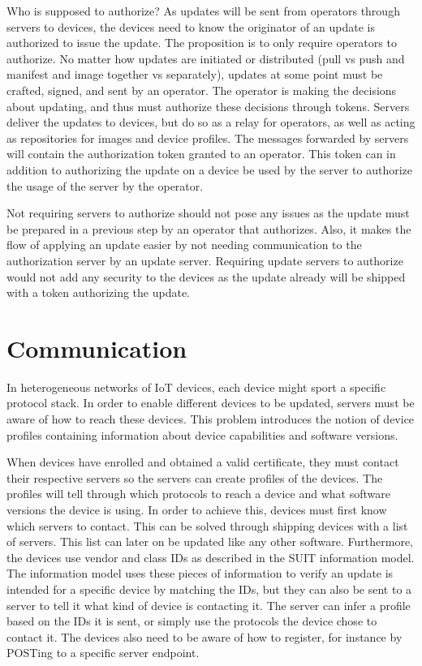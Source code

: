 \documentclass[0-thesis.tex]{subfiles}
\begin{document}
Who is supposed to authorize? As updates will be sent from operators through servers to
devices, the devices need to know the originator of an update is authorized to issue the
update. The proposition is to only require operators to authorize. No matter how updates
are initiated or distributed (pull vs push and manifest and image together vs separately),
updates at some point must be crafted, signed, and sent by an operator. The operator is
making the decisions about updating, and thus must authorize these decisions through
tokens. Servers deliver the updates to devices, but do so as a relay for operators, as
well as acting as repositories for images and device profiles. The messages forwarded by
servers will contain the authorization token granted to an operator. This token can in
addition to authorizing the update on a device be used by the server to authorize the
usage of the server by the operator. 

Not requiring servers to authorize should not pose any issues as the update must be
prepared in a previous step by an operator that authorizes. Also, it makes the flow of
applying an update easier by not needing communication to the authorization server by an
update server. Requiring update servers to authorize would not add any security to the
devices as the update already will be shipped with a token authorizing the update.

\section{Communication}
\label{sec:communication}
In heterogeneous networks of IoT devices, each device might sport a specific protocol
stack. In order to enable different devices to be updated, servers must be aware of how to
reach these devices. This problem introduces the notion of device profiles containing
information about device capabilities and software versions. 

When devices have enrolled and obtained a valid certificate, they must contact their
respective servers so the servers can create profiles of the devices. The profiles will
tell through which protocols to reach a device and what software versions the device is
using. In order to achieve this, devices must first know which servers to contact. This
can be solved through shipping devices with a list of servers. This list can later on be
updated like any other software. Furthermore, the devices use vendor and class IDs as
described in the SUIT information model. The information model uses these pieces of
information to verify an update is intended for a specific device by matching the IDs, but
they can also be sent to a server to tell it what kind of device is contacting it. The
server can infer a profile based on the IDs it is sent, or simply use the protocols the
device chose to contact it. The devices also need to be aware of how to register, for
instance by POSTing to a specific server endpoint. 
\end{document}

